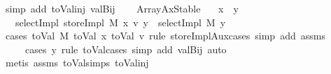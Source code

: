 \begin{isabellebody}
\ {\isacharparenleft}{\kern0pt}simp\ add{\isacharcolon}{\kern0pt}\ toVal{}{}{}{}{\isacharunderscore}{\kern0pt}inj\ valBij{\isacharparenright}{\kern0pt}\isanewline
\ \ \isamarkupfalse%
\isanewline
{}\isamarkupfalse%
%
\endisatagproof
{\isafoldproof}%
%
\isadelimproof
%
\endisadelimproof
%
\isadelimdocument
%
\endisadelimdocument
%
\isatagdocument
%
\isamarkuptrue%
%
\endisatagdocument
{\isafolddocument}%
%
\isadelimdocument
%
\endisadelimdocument
{}\isamarkupfalse%
\ ArrayAxStable{\isacharcolon}{\kern0pt}\isanewline
\isanewline
\ \ \ {\isachardoublequoteopen}x\ {\isasymnoteq}\ y{\isachardoublequoteclose}\isanewline
\ \ \ {\isachardoublequoteopen}selectImpl\ {\isacharparenleft}{\kern0pt}storeImpl\ M\ x\ v{\isacharparenright}{\kern0pt}\ y\ {\isacharequal}{\kern0pt}\ selectImpl\ M\ y{\isachardoublequoteclose}\isanewline
%
\isadelimproof
\ \ %
\endisadelimproof
%
\isatagproof
{}\isamarkupfalse%
\ {\isacharparenleft}{\kern0pt}cases\ {\isachardoublequoteopen}{\isacharparenleft}{\kern0pt}toVal{}{}{}{}\ M{\isacharcomma}{\kern0pt}\ toVal{}{}{}{}\ x{\isacharcomma}{\kern0pt}\ toVal{}{}{}{}\ v{\isacharparenright}{\kern0pt}{\isachardoublequoteclose}\ rule{\isacharcolon}{\kern0pt}\ storeImplAux{\isachardot}{\kern0pt}cases{\isacharsemicolon}{\kern0pt}\ {\isacharparenleft}{\kern0pt}simp\ add{\isacharcolon}{\kern0pt}\ assms{\isacharparenright}{\kern0pt}{\isacharsemicolon}{\kern0pt}\isanewline
\ \ \ \ \ cases\ y\ rule{\isacharcolon}{\kern0pt}\ toVal{}{}{}{}{\isachardot}{\kern0pt}cases{\isacharsemicolon}{\kern0pt}\ {\isacharparenleft}{\kern0pt}simp\ add{\isacharcolon}{\kern0pt}\ valBij{\isacharparenright}{\kern0pt}{\isacharsemicolon}{\kern0pt}\ auto{\isacharparenright}{\kern0pt}\isanewline
\ \ \ \ \ \isamarkupfalse%
\ {\isacharparenleft}{\kern0pt}metis\ assms\ toVal{}{}{}{}{\isachardot}{\kern0pt}simps\ toVal{}{}{}{}{\isacharunderscore}{\kern0pt}inj{\isacharparenright}{\kern0pt}{\isacharplus}{\kern0pt}\isanewline
\ \ \isamarkupfalse%
%
\endisatagproof
{\isafoldproof}%
%
\isadelimproof
%
\endisadelimproof
%
\isadelimdocument
%
\endisadelimdocument

\end{isabellebody}
